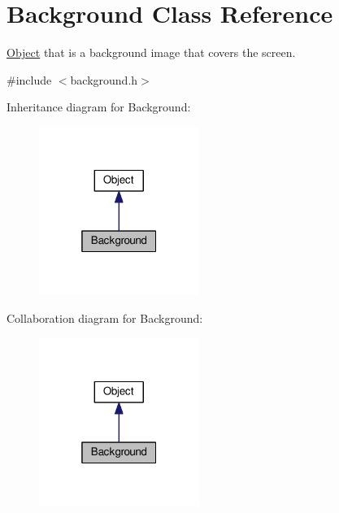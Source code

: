 \hypertarget{classBackground}{}\section{Background Class Reference}
\label{classBackground}


\hyperlink{classObject}{Object} that is a background image that covers the screen.  




{\ttfamily \#include $<$background.\+h$>$}



Inheritance diagram for Background\+:
\nopagebreak
\begin{figure}[H]
\begin{center}
\leavevmode
\includegraphics[width=148pt]{classBackground__inherit__graph}
\end{center}
\end{figure}


Collaboration diagram for Background\+:
\nopagebreak
\begin{figure}[H]
\begin{center}
\leavevmode
\includegraphics[width=148pt]{classBackground__coll__graph}
\end{center}
\end{figure}
